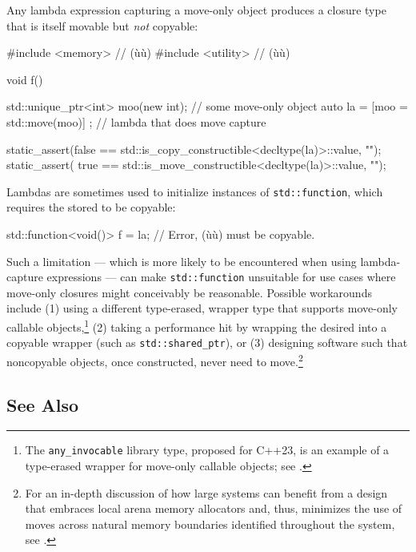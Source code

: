 Any lambda expression capturing a move-only object produces a closure
type that is itself movable but \emph{not} copyable:

\begin{emcppshiddenlisting}[emcppsbatch=e4,emcppsstandards={c++14}]
#include <memory>   // (ù{}ù)
#include <utility>  // (ù{}ù)
\end{emcppshiddenlisting}
\begin{emcppslisting}[emcppsbatch=e4]
void f()
{
    std::unique_ptr<int> moo(new int);    // some move-only object
    auto la = [moo = std::move(moo)]{ };  // lambda that does move capture

    static_assert(false == std::is_copy_constructible<decltype(la)>::value, "");
    static_assert( true == std::is_move_constructible<decltype(la)>::value, "");
}
\end{emcppslisting}

\noindent Lambdas are sometimes used to initialize instances of
\lstinline!std::function!, which requires the stored  to be copyable:

\begin{emcppslisting}
std::function<void()> f = la;  // Error, (ù{}ù) must be copyable.
\end{emcppslisting}

\noindent Such a limitation --- which is more likely to be encountered when using
lambda-capture expressions --- can make \lstinline!std::function!
unsuitable for use cases where move-only closures might conceivably be
reasonable. Possible workarounds include (1) using a different
type-erased,  wrapper type that supports
move-only callable objects,{\cprotect\footnote{The
\lstinline!any_invocable! library type, proposed for C++23, is an
example of a type-erased wrapper for move-only callable objects; see
  \cite{calabrese20}.}} (2) taking a performance hit by wrapping the
desired  into a copyable wrapper (such as
\lstinline!std::shared_ptr!), or (3) designing software such that
noncopyable objects, once constructed, never need to
move.\footnote{For an in-depth discussion of how large systems can
benefit from a design that embraces local arena memory allocators and,
thus, minimizes the use of moves across natural memory boundaries
identified throughout the system, see \cite{lakos22}.}

\subsection[See Also]{See Also}\label{see-also}

